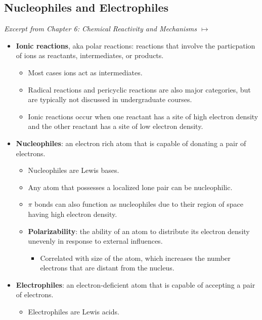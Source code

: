 \documentclass[12pt,a4paper]{article}
\begin{document}
\subsection{Nucleophiles and Electrophiles}
{\color{darklc}\textit{Excerpt from Chapter 6: Chemical Reactivity and Mechanisms $\mapsto$}}
\begin{itemize}
    \item \textbf{Ionic reactions}, {\color{G-Moon}aka polar reactions}: reactions that involve the particpation of ions as reactants, intermediates, or products.
        \begin{itemize}
            \item Most cases ions act as intermediates.
            \item Radical reactions and pericyclic reactions are also major categories, but are typically not discussed in undergraduate courses.
            \item Ionic reactions occur when one reactant has a site of {\color{neg}high electron density} and the other reactant has a site of {\color{pos}low electron density}.
        \end{itemize}
    \item \textbf{Nucleophiles}: an electron rich atom that is capable of donating a pair of electrons.
        \begin{itemize}
            \item {\color{neg}Nucleophiles are Lewis bases}.
            \item Any atom that possesses a localized lone pair can be nucleophilic.
            \item $\pi$ bonds can also function as nucleophiles due to their region of space having high electron density.
            \item \textbf{Polarizability}: the ability of an atom to distribute its electron density unevenly in response to external influences.
                \begin{itemize}
                    \item Correlated with size of the atom, which increases the number electrons that are distant from the nucleus.
                \end{itemize}
        \end{itemize}
    \item \textbf{Electrophiles}: an electron-deficient atom that is capable of accepting a pair of electrons.
        \begin{itemize}
            \item {\color{pos}Electrophiles are Lewis acids}.
        \end{itemize}
\end{itemize}
\end{document}

